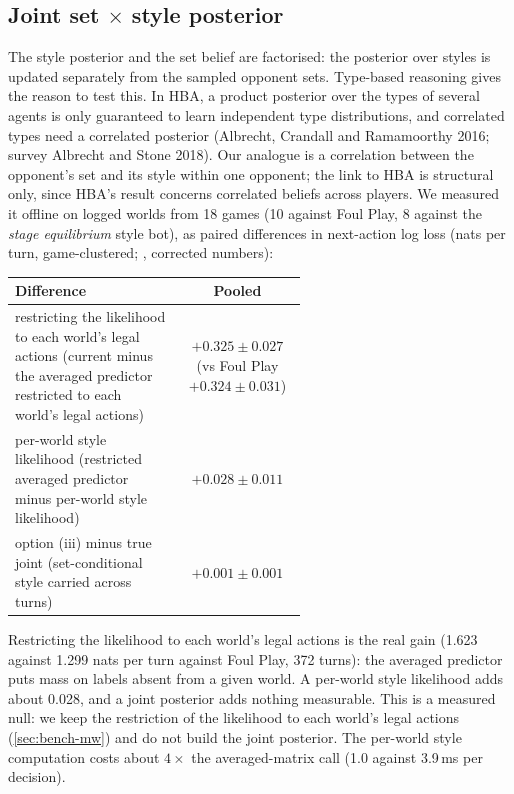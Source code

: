 \documentclass[10pt]{article}
\theoremstyle{plain}
\theoremstyle{definition}
\theoremstyle{remark}
\newcommand{\src}[1]{\path{#1}}
\begin{document}
\subsection{Joint set $\times$ style posterior}\label{sec:bench-joint}

The style posterior and the set belief are factorised: the posterior over styles is updated separately from the sampled
opponent sets. Type-based reasoning gives the reason to test this. In HBA, a product posterior over the types of several
agents is only guaranteed to learn independent type distributions, and correlated types need a correlated posterior
(Albrecht, Crandall and Ramamoorthy 2016; survey Albrecht and Stone 2018). Our analogue is a correlation between the
opponent's set and its style within one opponent; the link to HBA is structural only, since HBA's result concerns
correlated beliefs across players. We measured it offline on logged worlds from 18 games (10 against Foul Play, 8 against the
\emph{stage equilibrium} style bot), as paired differences in next-action log loss (nats per turn, game-clustered;
\src{research/joint_posterior.md}, corrected numbers):
\begin{center}\small
\begin{tabular}{@{}p{0.58\linewidth}c@{}}\toprule
Difference & Pooled \\ \midrule
restricting the likelihood to each world's legal actions (current minus the averaged predictor restricted to each world's legal actions) & $+0.325\pm0.027$ (vs Foul Play $+0.324\pm0.031$) \\
per-world style likelihood (restricted averaged predictor minus per-world style likelihood) & $+0.028\pm0.011$ \\
option (iii) minus true joint (set-conditional style carried across turns) & $+0.001\pm0.001$ \\ \bottomrule
\end{tabular}
\end{center}
Restricting the likelihood to each world's legal actions is the real gain (1.623 against 1.299 nats per turn against Foul Play, 372 turns): the averaged predictor puts
mass on labels absent from a given world. A per-world style likelihood adds about 0.028, and a joint posterior
adds nothing measurable. This is a measured null: we keep the restriction of the likelihood to each world's legal actions (\cref{sec:bench-mw}) and do not build the
joint posterior. The per-world style computation costs about $4\times$ the averaged-matrix call (1.0 against 3.9\,ms per
decision).
\end{document}
